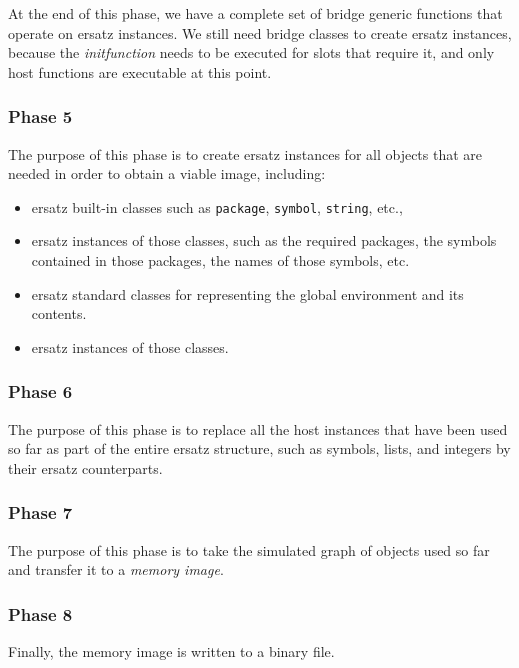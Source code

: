 At the end of this phase, we have a complete set of bridge generic
functions that operate on ersatz instances.  We still need bridge
classes to create ersatz instances, because the \emph{initfunction}
needs to be executed for slots that require it, and only host
functions are executable at this point.

\subsubsection{Phase 5}

The purpose of this phase is to create ersatz instances for all
objects that are needed in order to obtain a viable image, including: 

\begin{itemize}
\item ersatz built-in classes such as \texttt{package}, \texttt{symbol},
  \texttt{string}, etc., 
\item ersatz instances of those classes, such as the required
  packages, the symbols contained in those packages, the names of
  those symbols, etc.
\item ersatz standard classes for representing the global environment
  and its contents.
\item ersatz instances of those classes.
\end{itemize}

\subsubsection{Phase 6}

The purpose of this phase is to replace all the host instances that
have been used so far as part of the entire ersatz structure, such as
symbols, lists, and integers by their ersatz counterparts.

\subsubsection{Phase 7}

The purpose of this phase is to take the simulated graph of objects
used so far and transfer it to a \emph{memory image}.  

\subsubsection{Phase 8}

Finally, the memory image is written to a binary file. 


